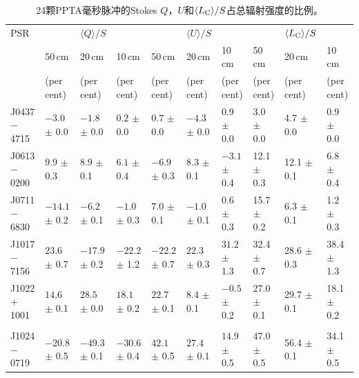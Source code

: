 %
\begin{landscape}
\begin{table}
\small
\begin{center}
\caption{24颗PPTA毫秒脉冲的Stokes $Q$，$U$和$\langle L_{\rm{C}} \rangle/S$占总辐射强度的比例。}
\label{tablePol2}
\begin{tabular}{p{1.9cm}p{1.88cm}p{1.88cm}p{1.88cm}p{1.88cm}p{1.88cm}p{1.88cm}p{1.8cm}p{1.8cm}p{1.8cm}}
\hline
PSR              &                  &    $\langle Q \rangle/S$    &                  &               & $\langle U \rangle/S$       &                  &      &      $\langle L_{\rm{C}}\rangle/S$       &                      \\
								 &    50\,cm      &   20\,cm       &    10\,cm &    50\,cm      &   20\,cm       &    10\,cm &    50\,cm      &   20\,cm       &    10\,cm              \\
								 &     (per cent)   &         (per cent)          &     (per cent)   &    (per cent)   &         (per cent)          &     (per cent)   &   (per cent)   &         (per cent)          &     (per cent)  \\
\hline
J0437$-$4715 &$-3.0 $ $\pm$ 0.0 & $-1.8 $ $\pm$ 0.0 & $0.2  $ $\pm$ 0.0 & $0.7  $ $\pm$ 0.0 & $-4.3 $ $\pm$ 0.0 & $0.9  $ $\pm$ 0.0 & 3.0  $\pm$ 0.0 & 4.7  $\pm$ 0.0 & 0.9  $\pm$ 0.0 \\
J0613$-$0200 &$9.9  $ $\pm$ 0.3 & $8.9  $ $\pm$ 0.1 & $6.1  $ $\pm$ 0.4 & $-6.9 $ $\pm$ 0.3 & $8.3  $ $\pm$ 0.1 & $-3.1 $ $\pm$ 0.4 & 12.1 $\pm$ 0.3 & 12.1 $\pm$ 0.1 & 6.8  $\pm$ 0.4 \\
J0711$-$6830 &$-14.1$ $\pm$ 0.2 & $-6.2 $ $\pm$ 0.1 & $-1.0 $ $\pm$ 0.3 & $7.0  $ $\pm$ 0.1 & $-1.0 $ $\pm$ 0.1 & $0.6  $ $\pm$ 0.3 & 15.7 $\pm$ 0.2 & 6.3  $\pm$ 0.1 & 1.2  $\pm$ 0.3 \\
J1017$-$7156 &$23.6 $ $\pm$ 0.7 & $-17.9$ $\pm$ 0.2 & $-22.2$ $\pm$ 1.2 & $-22.2$ $\pm$ 0.7 & $22.3 $ $\pm$ 0.3 & $31.2 $ $\pm$ 1.3 & 32.4 $\pm$ 0.7 & 28.6 $\pm$ 0.3 & 38.4 $\pm$ 1.3 \\
J1022$+$1001 &$14.6 $ $\pm$ 0.1 & $28.5 $ $\pm$ 0.0 & $18.1 $ $\pm$ 0.2 & $22.7 $ $\pm$ 0.1 & $8.4  $ $\pm$ 0.1 & $-0.5 $ $\pm$ 0.2 & 27.0 $\pm$ 0.1 & 29.7 $\pm$ 0.1 & 18.1 $\pm$ 0.2 \\
             &                &                 &                &                   &                   &                   &                &                &                 \\
J1024$-$0719 &$-20.8$ $\pm$ 0.5 & $-49.3$ $\pm$ 0.1 & $-30.6$ $\pm$ 0.4 & $42.1 $ $\pm$ 0.5 & $27.4 $ $\pm$ 0.1 & $14.9 $ $\pm$ 0.5 & 47.0 $\pm$ 0.5 & 56.4 $\pm$ 0.1 & 34.1 $\pm$ 0.5 \\

\end{tabular}
\end{center}
\end{table}
\end{landscape}
